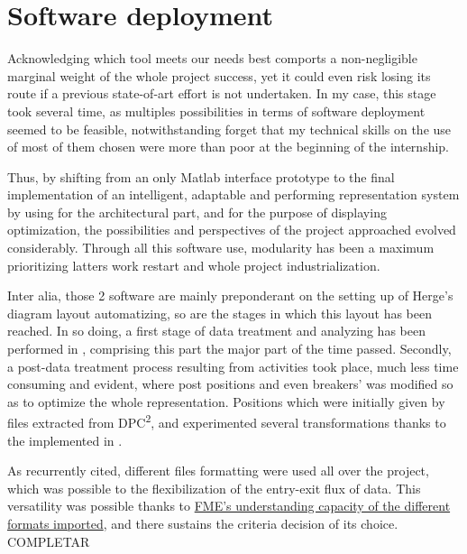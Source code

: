 \section{Software deployment}
\label{sec:approach:software}

Acknowledging which tool meets our needs best comports a non-negligible marginal weight of the whole project success, yet it could even risk losing its route if a previous state-of-art effort is not undertaken. In my case, this stage took several time, as multiples possibilities in terms of software deployment seemed to be feasible, notwithstanding forget that my technical skills on the use of most of them chosen were more than poor at the beginning of the internship.

Thus, by shifting from an only Matlab interface prototype  to the final implementation of an intelligent, adaptable and performing representation system by using  for the architectural part, and  for the purpose of displaying optimization, the possibilities and perspectives of the project approached evolved considerably. Through all this software use, modularity has been a maximum prioritizing latters work restart and whole project industrialization.


Inter alia, those 2 software are mainly preponderant on the setting up of Herge's diagram layout automatizing, so are the stages in which this layout has been reached. In so doing, a first stage of data treatment and analyzing has been performed in , comprising this part the major part of the time passed. Secondly, a post-data treatment process resulting from  activities took place, much less time consuming and evident, where post positions and even breakers' was modified so as to optimize the whole representation. Positions which were initially given by files extracted from DPC\textsuperscript{2}, and experimented several transformations thanks to the implemented in . 

As recurrently cited, different files formatting were used all over the project, which was possible to the flexibilization of the entry-exit flux of data. This versatility was possible thanks to \hyperref[fig:FMEversatility]{FME's understanding capacity of the different formats imported}, and there sustains the  criteria decision of its choice. COMPLETAR

